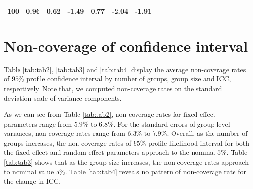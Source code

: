 \documentclass[12pt,oneside,a4paper]{reedthesis}
\begin{document}
\begin{longtable}[]{@{}llllllllll@{}}
\begin{minipage}[t]{0.05\columnwidth}
100\strut
\end{minipage} & \begin{minipage}[t]{0.07\columnwidth}\raggedright
0.96\strut
\end{minipage} & \begin{minipage}[t]{0.07\columnwidth}\raggedright
0.62\strut
\end{minipage} & \begin{minipage}[t]{0.07\columnwidth}\raggedright
-1.49\strut
\end{minipage} & \begin{minipage}[t]{0.07\columnwidth}\raggedright
0.77\strut
\end{minipage} & \begin{minipage}[t]{0.09\columnwidth}\raggedright
-2.04\strut
\end{minipage} & \begin{minipage}[t]{0.09\columnwidth}\raggedright
-1.91\strut
\end{minipage}\tabularnewline
\bottomrule
\end{longtable}
\hypertarget{non-coverage-of-confidence-interval}{%
\section{Non-coverage of confidence interval}\label{non-coverage-of-confidence-interval}}

Table \ref{tab:tab2}, \ref{tab:tab3} and \ref{tab:tab4} display the average non-coverage rates of \(95\%\) profile confidence interval by number of groups, group size and ICC, respectively. Note that, we computed non-coverage rates on the standard deviation scale of variance components.

As we can see from Table \ref{tab:tab2}, non-coverage rates for fixed effect parameters range from \(5.9\%\) to \(6.8\%\). For the standard errors of group-level variances, non-coverage rates range from \(6.3\%\) to \(7.9\%\). Overall, as the number of groups increases, the non-coverage rates of \(95\%\) profile likelihood interval for both the fixed effect and random effect parameters approach to the nominal \(5\%\).
Table \ref{tab:tab3} shows that as the group size increases, the non-coverage rates approach to nominal value \(5\%\).
Table \ref{tab:tab4} reveals no pattern of non-coverage rate for the change in ICC.
\end{document}
